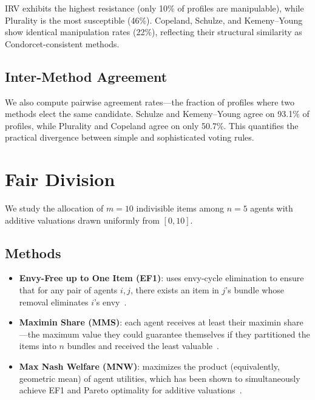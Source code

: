 \documentclass[10pt]{article}
\begin{document}
IRV exhibits the highest resistance (only 10\% of profiles are manipulable), while Plurality is the most susceptible (46\%). Copeland, Schulze, and Kemeny--Young show identical manipulation rates (22\%), reflecting their structural similarity as Condorcet-consistent methods.

\subsection{Inter-Method Agreement}

We also compute pairwise agreement rates---the fraction of profiles where two methods elect the same candidate. Schulze and Kemeny--Young agree on 93.1\% of profiles, while Plurality and Copeland agree on only 50.7\%. This quantifies the practical divergence between simple and sophisticated voting rules.

\section{Fair Division}
\label{sec:fairdiv}

We study the allocation of $m=10$ indivisible items among $n=5$ agents with additive valuations drawn uniformly from $[0,10]$.

\subsection{Methods}

\begin{itemize}[leftmargin=*,itemsep=1pt]
  \item \textbf{Envy-Free up to One Item (EF1)}: uses envy-cycle elimination to ensure that for any pair of agents $i,j$, there exists an item in $j$'s bundle whose removal eliminates $i$'s envy~\citep{budish2011combinatorial, lipton2004approximately}.
  \item \textbf{Maximin Share (MMS)}: each agent receives at least their maximin share---the maximum value they could guarantee themselves if they partitioned the items into $n$ bundles and received the least valuable~\citep{budish2011combinatorial}.
  \item \textbf{Max Nash Welfare (MNW)}: maximizes the product (equivalently, geometric mean) of agent utilities, which has been shown to simultaneously achieve EF1 and Pareto optimality for additive valuations~\citep{caragiannis2019unreasonable}.
\end{itemize}
\end{document}

